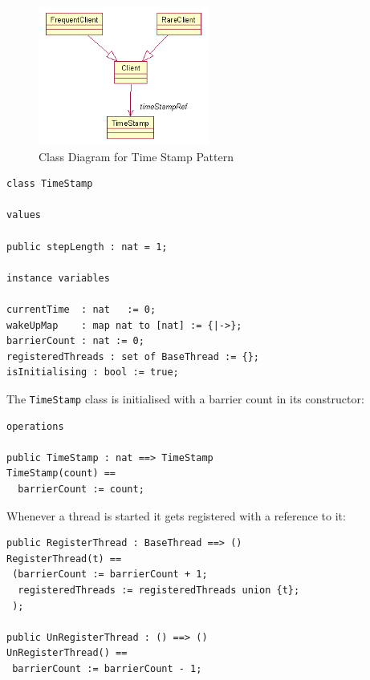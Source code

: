 \documentclass{overturerepchap}
\begin{document}
\begin{figure}
\begin{center}
\includegraphics[width=0.5\textwidth]{figures/timestamp.png}
\end{center}
\caption{Class Diagram for Time Stamp Pattern\label{fig:classtimestamp}}
\end{figure}


\begin{lstlisting}
class TimeStamp

values

public stepLength : nat = 1;

instance variables

currentTime  : nat   := 0;
wakeUpMap    : map nat to [nat] := {|->};
barrierCount : nat := 0;
registeredThreads : set of BaseThread := {};
isInitialising : bool := true;
\end{lstlisting}

The \texttt{TimeStamp} class is initialised with a barrier count in its
constructor:

\begin{lstlisting}
operations

public TimeStamp : nat ==> TimeStamp
TimeStamp(count) ==
  barrierCount := count;
\end{lstlisting}

Whenever a thread is started it gets registered with a reference to it:

\begin{lstlisting}
public RegisterThread : BaseThread ==> ()
RegisterThread(t) ==
 (barrierCount := barrierCount + 1;
  registeredThreads := registeredThreads union {t};  
 );
 
public UnRegisterThread : () ==> ()
UnRegisterThread() ==
 barrierCount := barrierCount - 1;
\end{lstlisting}
\end{document}
